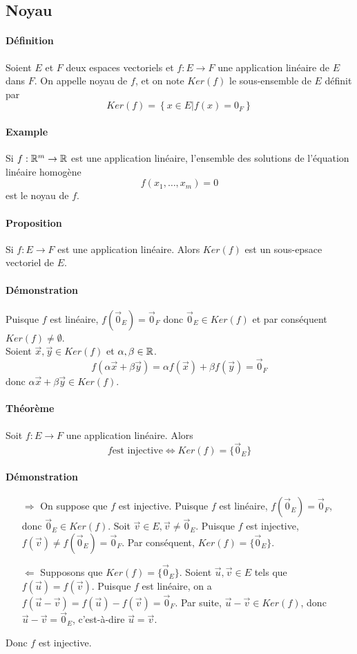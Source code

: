 %
\subsection{Noyau}
%
\paragraph{Définition} Soient $E$ et $F$ deux espaces vectoriels et $f: E \rightarrow F$ une application linéaire de $E$ dans $F$. On appelle noyau de $f$, et on note $Ker(f)$ le sous-ensemble de $E$ définit par
$$Ker(f) = \left\{ x\in E \vert f(x) = 0_F \right\}$$

\paragraph{Example} Si $f: \mathbb{R}^m \rightarrow \mathbb{R}$ est une application linéaire, l'ensemble des solutions de l'équation linéaire homogène
$$f(x_1, \ldots, x_m) = 0$$
est le noyau de $f$.

\paragraph{Proposition} Si $f: E \rightarrow F$ est une application linéaire. Alors $Ker(f)$ est un sous-epsace vectoriel de $E$.

\paragraph{Démonstration} Puisque $f$ est linéaire, $f(\vec{0}_E) = \vec{0}_F$ donc $\vec{0}_E \in Ker(f)$ et par conséquent $Ker(f) \neq \emptyset$. \\
Soient $\vec{x}, \vec{y} \in Ker(f)$ et $\alpha, \beta \in \mathbb{R}$.
$$f(\alpha \vec{x} + \beta \vec{y}) = \alpha f(\vec{x}) + \beta f(\vec{y}) = \vec{0}_F$$
donc $\alpha \vec{x} + \beta \vec{y} \in Ker(f)$.

\paragraph{Théorème} Soit $f: E \rightarrow F$ une application linéaire. Alors
$$f \text{est injective} \Leftrightarrow Ker(f) = \{\vec{0}_E\}$$
\paragraph{Démonstration} 
\begin{itemize}
  \item[$\Rightarrow$] On suppose que $f$ est injective. Puisque $f$ est linéaire, $f(\vec{0}_E) = \vec{0}_F$, donc $\vec{0}_E \in Ker(f)$. Soit $\vec{v} \in E, \vec{v}\neq \vec{0}_E$. Puisque $f$ est injective, $f(\vec{v}) \neq f(\vec{0}_E) = \vec{0}_F$. Par conséquent, $Ker(f) = \{\vec{0}_E\}$.
  \item[$\Leftarrow$] Supposons que $Ker(f) = \{\vec{0}_E\}$. Soient $\vec{u}, \vec{v} \in E$ tels que $f(\vec{u}) = f(\vec{v})$. Puisque $f$ est linéaire, on a $f(\vec{u} - \vec{v}) = f(\vec{u}) - f(\vec{v}) = \vec{0}_F$. Par suite, $\vec{u} - \vec{v} \in Ker(f)$, donc $\vec{u}-\vec{v} = \vec{0}_E$, c'est-à-dire $\vec{u} = \vec{v}$.
\end{itemize}
Donc $f$ est injective.

